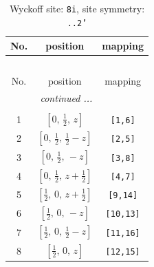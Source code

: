 \documentclass[fleqn,8pt]{jsarticle}
\begin{document}
\begin{longtable}{ccc}
\caption{Wyckoff site: {\tt 8i}, site symmetry: {\tt ..2'}}
 \\
 \hline \hline
No. & position & mapping \\ \hline \endfirsthead

\multicolumn{2}{l}{\tablename\ \thetable{}} \\
 \hline \hline
No. & position & mapping \\ \hline \endhead

 \hline \hline
\multicolumn{2}{r}{\footnotesize\it continued ...} \\ \endfoot

 \hline \hline
\multicolumn{2}{r}{} \\ \endlastfoot

1 & $\left[ 0,\, \frac{1}{2},\, z \right]$ & {\tt [1,6]} \\ \hline
2 & $\left[ 0,\, \frac{1}{2},\, \frac{1}{2} - z \right]$ & {\tt [2,5]} \\ \hline
3 & $\left[ 0,\, \frac{1}{2},\, - z \right]$ & {\tt [3,8]} \\ \hline
4 & $\left[ 0,\, \frac{1}{2},\, z + \frac{1}{2} \right]$ & {\tt [4,7]} \\ \hline
5 & $\left[ \frac{1}{2},\, 0,\, z + \frac{1}{2} \right]$ & {\tt [9,14]} \\ \hline
6 & $\left[ \frac{1}{2},\, 0,\, - z \right]$ & {\tt [10,13]} \\ \hline
7 & $\left[ \frac{1}{2},\, 0,\, \frac{1}{2} - z \right]$ & {\tt [11,16]} \\ \hline
8 & $\left[ \frac{1}{2},\, 0,\, z \right]$ & {\tt [12,15]} \\
\end{longtable}
\renewcommand{\arraystretch}{1.2}
\end{document}
